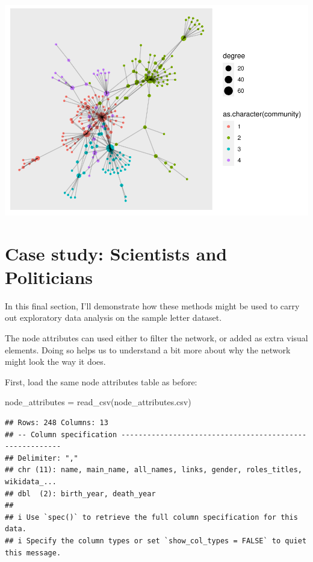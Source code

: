 \documentclass[
]{book}
\newenvironment{Shaded}{\begin{snugshade}}{\end{snugshade}}
\newcommand{\FunctionTok}[1]{\textcolor[rgb]{0.00,0.00,0.00}{#1}}
\newcommand{\NormalTok}[1]{#1}
\newcommand{\OtherTok}[1]{\textcolor[rgb]{0.56,0.35,0.01}{#1}}
\newcommand{\StringTok}[1]{\textcolor[rgb]{0.31,0.60,0.02}{#1}}
\begin{document}
\includegraphics{_main_files/figure-latex/unnamed-chunk-66-1.pdf}

\hypertarget{case-study-scientists-and-politicians}{%
\section{Case study: Scientists and Politicians}\label{case-study-scientists-and-politicians}}

In this final section, I'll demonstrate how these methods might be used to carry out exploratory data analysis on the sample letter dataset.

The node attributes can used either to filter the network, or added as extra visual elements. Doing so helps us to understand a bit more about why the network might look the way it does.

First, load the same node attributes table as before:

\begin{Shaded}
\begin{Highlighting}[]
\NormalTok{node\_attributes }\OtherTok{=} \FunctionTok{read\_csv}\NormalTok{(}\StringTok{\textquotesingle{}node\_attributes.csv\textquotesingle{}}\NormalTok{)}
\end{Highlighting}
\end{Shaded}

\begin{verbatim}
## Rows: 248 Columns: 13
## -- Column specification --------------------------------------------------------
## Delimiter: ","
## chr (11): name, main_name, all_names, links, gender, roles_titles, wikidata_...
## dbl  (2): birth_year, death_year
## 
## i Use `spec()` to retrieve the full column specification for this data.
## i Specify the column types or set `show_col_types = FALSE` to quiet this message.
\end{verbatim}
\end{document}
